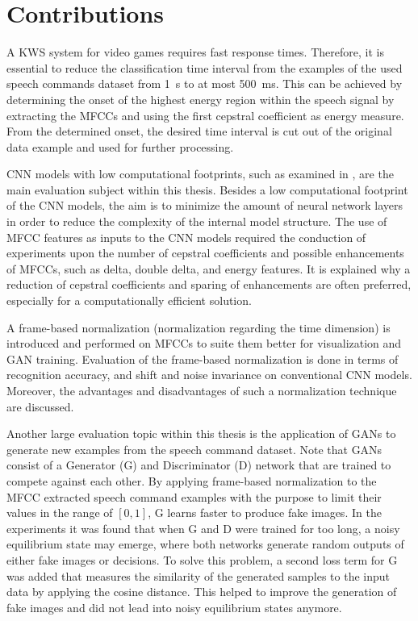 
\section{Contributions}
A KWS system for video games requires fast response times.
Therefore, it is essential to reduce the classification time interval from the examples of the used speech commands dataset \cite{Warden2018} from \SI{1}{\second} to at most \SI{500}{\milli\second}.
This can be achieved by determining the onset of the highest energy region within the speech signal by extracting the MFCCs and using the first cepstral coefficient as energy measure.
From the determined onset, the desired time interval is cut out of the original data example and used for further processing.

CNN models with low computational footprints, such as examined in \cite{Sainath2015}, are the main evaluation subject within this thesis.
Besides a low computational footprint of the CNN models, the aim is to minimize the amount of neural network layers in order to reduce the complexity of the internal model structure.
The use of MFCC features as inputs to the CNN models required the conduction of experiments upon the number of cepstral coefficients and possible enhancements of MFCCs, such as delta, double delta, and energy features.
It is explained why a reduction of cepstral coefficients and sparing of enhancements are often preferred, especially for a computationally efficient solution.

A frame-based normalization (normalization regarding the time dimension) is introduced and performed on MFCCs to suite them better for visualization and GAN training.
Evaluation of the frame-based normalization is done in terms of recognition accuracy, and shift and noise invariance on conventional CNN models.
Moreover, the advantages and disadvantages of such a normalization technique are discussed.

Another large evaluation topic within this thesis is the application of GANs to generate new examples from the speech command dataset.
Note that GANs consist of a Generator (G) and Discriminator (D) network that are trained to compete against each other.
By applying frame-based normalization to the MFCC extracted speech command examples with the purpose to limit their values in the range of $[0, 1]$, G learns faster to produce fake images.
In the experiments it was found that when G and D were trained for too long, a noisy equilibrium state may emerge, where both networks generate random outputs of either fake images or decisions.
To solve this problem, a second loss term for G was added that measures the similarity of the generated samples to the input data by applying the cosine distance.
This helped to improve the generation of fake images and did not lead into noisy equilibrium states anymore.

